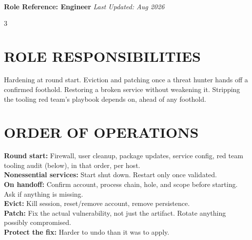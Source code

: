 \documentclass[7pt,landscape]{article}
\begin{document}
\textbf{Role Reference: Engineer} \hfill \textit{Last Updated: Aug 2026}
\raggedcolumns
\begin{multicols*}{3}

\section{ROLE RESPONSIBILITIES}
Hardening at round start. Eviction and patching once a threat hunter hands off a confirmed foothold. Restoring a broken service without weakening it. Stripping the tooling red team's playbook depends on, ahead of any foothold.

\section{ORDER OF OPERATIONS}
\textbf{Round start:} Firewall, user cleanup, package updates, service config, red team tooling audit (below), in that order, per host. \\
\textbf{Nonessential services:} Start shut down. Restart only once validated. \\
\textbf{On handoff:} Confirm account, process chain, hole, and scope before starting. Ask if anything is missing. \\
\textbf{Evict:} Kill session, reset/remove account, remove persistence. \\
\textbf{Patch:} Fix the actual vulnerability, not just the artifact. Rotate anything possibly compromised. \\
\textbf{Protect the fix:} Harder to undo than it was to apply.


\end{multicols*}
\end{document}
